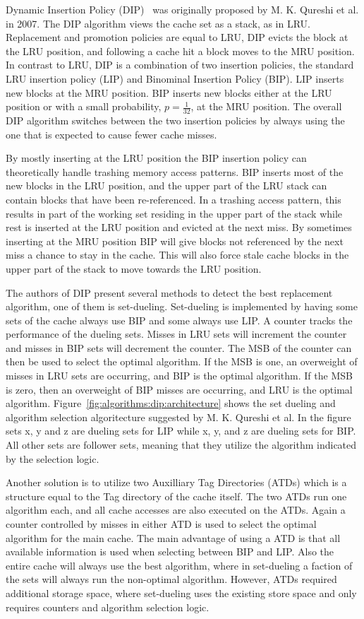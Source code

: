 Dynamic Insertion Policy (DIP)~\cite{Qureshi2007} was originally proposed by M. K. Qureshi et al. in 2007.
The DIP algorithm views the cache set as a stack, as in LRU.
Replacement and promotion policies are equal to LRU, DIP evicts the block at the LRU position, and following a cache hit a block moves to the MRU position.
In contrast to LRU, DIP is a combination of two insertion policies, the standard LRU insertion policy (LIP) and Binominal Insertion Policy (BIP).
LIP inserts new blocks at the MRU position.
BIP inserts new blocks either at the LRU position or with a small probability, $p = \frac{1}{32}$, at the MRU position. 
The overall DIP algorithm switches between the two insertion policies by always using the one that is expected to cause fewer cache misses.

By mostly inserting at the LRU position the BIP insertion policy can theoretically handle trashing memory access patterns.
BIP inserts most of the new blocks in the LRU position, and the upper part of the LRU stack can contain blocks that have been re-referenced.
In a trashing access pattern, this results in part of the working set residing in the upper part of the stack while rest is inserted at the LRU position and evicted at the next miss.
By sometimes inserting at the MRU position BIP will give blocks not referenced by the next miss a chance to stay in the cache. 
This will also force stale cache blocks in the upper part of the stack to move towards the LRU position.

The authors of DIP present several methods to detect the best replacement algorithm, one of them is set-dueling.
Set-dueling is implemented by having some sets of the cache always use BIP and some always use LIP.
A counter tracks the performance of the dueling sets.
Misses in LRU sets will increment the counter and misses in BIP sets will decrement the counter.
The MSB of the counter can then be used to select the optimal algorithm.
If the MSB is one, an overweight of misses in LRU sets are occurring, and BIP is the optimal algorithm. 
If the MSB is zero, then an overweight of BIP misses are occurring, and LRU is the optimal algorithm.
Figure~\ref{fig:algorithms:dip:architecture} shows the set dueling and algorithm selection algoritecture suggested by M. K. Qureshi et al.
In the figure sets x, y and z are dueling sets for LIP while x, y, and z are dueling sets for BIP.
All other sets are follower sets, meaning that they utilize the algorithm indicated by the selection logic.

Another solution is to utilize two Auxilliary Tag Directories (ATDs) which is a structure equal to the Tag directory of the cache itself.
The two ATDs run one algorithm each, and all cache accesses are also executed on the ATDs.
Again a counter controlled by misses in either ATD is used to select the optimal algorithm for the main cache.
The main advantage of using a ATD is that all available information is used when selecting between BIP and LIP.
Also the entire cache will always use the best algorithm, where in set-dueling a faction of the sets will always run the non-optimal algorithm.
However, ATDs required additional storage space, where set-dueling uses the existing store space and only requires counters and algorithm selection logic.